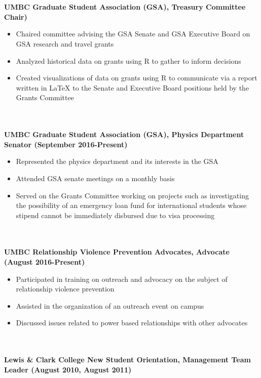 \documentclass{article}
\begin{document}
\phantom \\
\phantom \\
%
%
%
%
\noindent \textbf{UMBC Graduate Student Association (GSA), Treasury Committee Chair)}
\phantom \\
\begin{itemize}
\item Chaired committee advising the GSA Senate and GSA Executive Board on GSA research and travel grants
\item Analyzed historical data on grants using R to gather to inform decisions
\item Created visualizations of data on grants using R to communicate via a report written in LaTeX to the Senate and Executive Board positions held by the Grants Committee
\end{itemize}
\phantom \\
\phantom \\
%
%
%
%
\noindent \textbf{UMBC Graduate Student Association (GSA), Physics Department Senator (September 2016-Present)}
\phantom \\
\begin{itemize}
\item Represented the physics department and its interests in the GSA
\item Attended GSA senate meetings on a monthly basis
\item Served on the Grants Committee working on projects such as investigating the possibility of an emergency loan fund for international students whose stipend cannot be immediately disbursed due to visa processing
\end{itemize}
\phantom \\
\phantom \\
%
%
%
%
\noindent \textbf{UMBC Relationship Violence Prevention Advocates, Advocate (August 2016-Present)}
\phantom \\
\begin{itemize}
\item Participated in training on outreach and advocacy on the subject of relationship violence prevention
\item Assisted in the organization of an outreach event on campus
\item Discussed issues related to power based relationships with other advocates
\end{itemize}
\phantom \\
\phantom \\
%
%
%
%
\noindent \textbf{Lewis \& Clark College New Student Orientation, Management Team Leader (August 2010, August 2011)}
\end{document}
